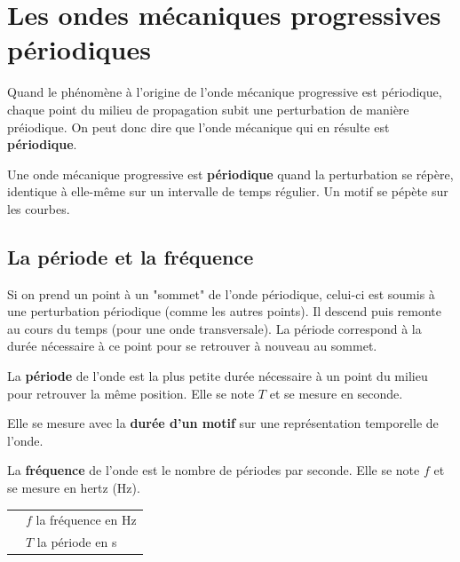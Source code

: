 \documentclass[a4paper,11pt,fleqn]{scrartcl}%
\begin{document}
\section{Les ondes mécaniques progressives périodiques}
Quand le phénomène à l'origine de l'onde mécanique progressive est périodique, chaque point du milieu de propagation subit une perturbation de manière préiodique. On peut donc dire que l'onde mécanique qui en résulte est \textbf{périodique}.
\begin{cours}
    Une onde mécanique progressive est \textbf{périodique} quand la perturbation se répère, identique à elle-même sur un intervalle de temps régulier. Un motif se pépète sur les courbes.
\end{cours}

    \subsection{La période et la fréquence}
    Si on prend un point à un "sommet" de l'onde périodique, celui-ci est soumis à une perturbation périodique (comme les autres points). Il descend puis remonte au cours du temps (pour une onde transversale). La période correspond à la durée nécessaire à ce point pour se retrouver à nouveau au sommet.
    \begin{cours}
        La \textbf{période} de l'onde est la plus petite durée nécessaire à un point du milieu pour retrouver la même position. Elle se note $T$ et se mesure en seconde.
    \end{cours}
    Elle se mesure avec la \textbf{durée d'un motif} sur une représentation temporelle de l'onde.
    \begin{cours}
        La \textbf{fréquence} de l'onde est le nombre de périodes par seconde. Elle se note $f$ et se mesure en hertz (\unit{\hertz}).
        \begin{center}
            \begin{tabular}{>{\centering}m{.3\linewidth}|l}
                \multirow{2}{*}{$ f = \dfrac{1}{T}$} & $f$ la fréquence en \unit{\hertz}\\
                & $T$ la période en \unit{\second}\\
            \end{tabular}
        \end{center}
    \end{cours}
\end{document}
